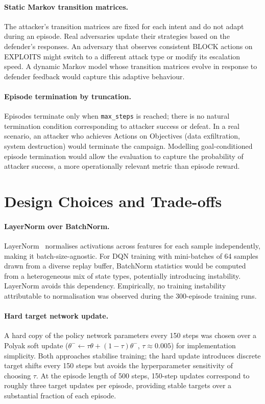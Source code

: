 \paragraph{Static Markov transition matrices.}
The attacker's transition matrices are fixed for each intent and do not
adapt during an episode.
Real adversaries update their strategies based on the defender's responses.
An adversary that observes consistent BLOCK actions on EXPLOITS might switch
to a different attack type or modify its escalation speed.
A dynamic Markov model whose transition matrices evolve in response to
defender feedback would capture this adaptive behaviour.

\paragraph{Episode termination by truncation.}
Episodes terminate only when \texttt{max\_steps} is reached; there is no
natural termination condition corresponding to attacker success or defeat.
In a real scenario, an attacker who achieves Actions on Objectives (data
exfiltration, system destruction) would terminate the campaign.
Modelling goal-conditioned episode termination would allow the evaluation
to capture the probability of attacker success, a more operationally
relevant metric than episode reward.

\section{Design Choices and Trade-offs}
\label{sec:disc_design}

\paragraph{LayerNorm over BatchNorm.}
LayerNorm~\citep{ba2016layer} normalises activations across features for
each sample independently, making it batch-size-agnostic.
For DQN training with mini-batches of 64 samples drawn from a diverse
replay buffer, BatchNorm statistics would be computed from a
heterogeneous mix of state types, potentially introducing instability.
LayerNorm avoids this dependency.
Empirically, no training instability attributable to normalisation was
observed during the 300-episode training runs.

\paragraph{Hard target network update.}
A hard copy of the policy network parameters every 150 steps was chosen
over a Polyak soft update ($\theta^- \leftarrow \tau\theta + (1-\tau)\theta^-$,
$\tau \approx 0.005$) for implementation simplicity.
Both approaches stabilise training; the hard update introduces discrete
target shifts every 150 steps but avoids the hyperparameter sensitivity
of choosing $\tau$.
At the episode length of 500 steps, 150-step updates correspond to roughly
three target updates per episode, providing stable targets over a substantial
fraction of each episode.

